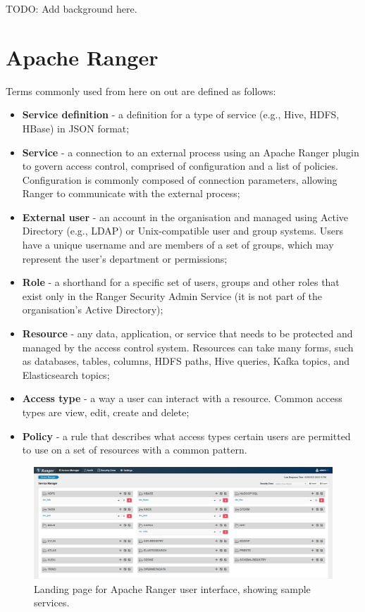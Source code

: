 TODO: Add background here.

\section{\label{sec:tech_background_apache_ranger} Apache Ranger}

Terms commonly used from here on out are defined as follows:

\begin{itemize}
    \item \textbf{Service definition} - a definition for a type of service (e.g., Hive, HDFS, HBase) in JSON format;
    \item \textbf{Service} - a connection to an external process using an Apache Ranger plugin to govern access control, comprised of configuration and a list of policies. Configuration is commonly composed of connection parameters, allowing Ranger to communicate with the external process;
    \item \textbf{External user} - an account in the organisation and managed using Active Directory (e.g., LDAP) or Unix-compatible user and group systems. Users have a unique username and are members of a set of groups, which may represent the user's department or permissions;
    \item \textbf{Role} - a shorthand for a specific set of users, groups and other roles that exist only in the Ranger Security Admin Service (it is not part of the organisation's Active Directory);
    \item \textbf{Resource} - any data, application, or service that needs to be protected and managed by the access control system. Resources can take many forms, such as databases, tables, columns, HDFS paths, Hive queries, Kafka topics, and Elasticsearch topics;
    \item \textbf{Access type} - a way a user can interact with a resource. Common access types are view, edit, create and delete; 
    \item \textbf{Policy} - a rule that describes what access types certain users are permitted to use on a set of resources with a common pattern.
\end{itemize}

\begin{figure}
    \centering
    \includegraphics[width=\textwidth]{chapters/tech_background/figures/ranger-admin.png}
    \caption{Landing page for Apache Ranger user interface, showing sample services.}
    \label{fig:ranger-admin}
\end{figure}

